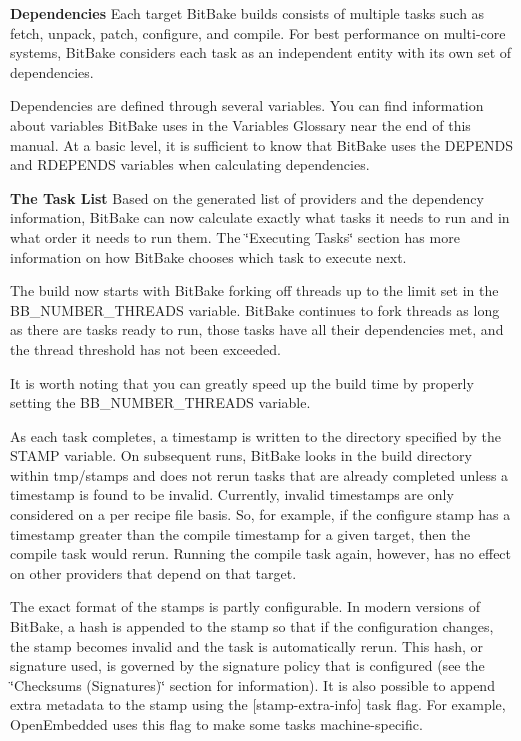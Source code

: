 \begin{DoxyItemize}
\item {\bfseries Dependencies} Each target Bit\+Bake builds consists of multiple tasks such as fetch, unpack, patch, configure, and compile. For best performance on multi-\/core systems, Bit\+Bake considers each task as an independent entity with its own set of dependencies.

Dependencies are defined through several variables. You can find information about variables Bit\+Bake uses in the Variables Glossary near the end of this manual. At a basic level, it is sufficient to know that Bit\+Bake uses the D\+E\+P\+E\+N\+DS and R\+D\+E\+P\+E\+N\+DS variables when calculating dependencies. ~\newline

\item {\bfseries The Task List} Based on the generated list of providers and the dependency information, Bit\+Bake can now calculate exactly what tasks it needs to run and in what order it needs to run them. The \char`\"{}\+Executing Tasks\char`\"{} section has more information on how Bit\+Bake chooses which task to execute next.

The build now starts with Bit\+Bake forking off threads up to the limit set in the B\+B\+\_\+\+N\+U\+M\+B\+E\+R\+\_\+\+T\+H\+R\+E\+A\+DS variable. Bit\+Bake continues to fork threads as long as there are tasks ready to run, those tasks have all their dependencies met, and the thread threshold has not been exceeded.

It is worth noting that you can greatly speed up the build time by properly setting the B\+B\+\_\+\+N\+U\+M\+B\+E\+R\+\_\+\+T\+H\+R\+E\+A\+DS variable.

As each task completes, a timestamp is written to the directory specified by the S\+T\+A\+MP variable. On subsequent runs, Bit\+Bake looks in the build directory within tmp/stamps and does not rerun tasks that are already completed unless a timestamp is found to be invalid. Currently, invalid timestamps are only considered on a per recipe file basis. So, for example, if the configure stamp has a timestamp greater than the compile timestamp for a given target, then the compile task would rerun. Running the compile task again, however, has no effect on other providers that depend on that target.

The exact format of the stamps is partly configurable. In modern versions of Bit\+Bake, a hash is appended to the stamp so that if the configuration changes, the stamp becomes invalid and the task is automatically rerun. This hash, or signature used, is governed by the signature policy that is configured (see the \char`\"{}\+Checksums (\+Signatures)\char`\"{} section for information). It is also possible to append extra metadata to the stamp using the \mbox{[}stamp-\/extra-\/info\mbox{]} task flag. For example, Open\+Embedded uses this flag to make some tasks machine-\/specific. ~\newline


\end{DoxyItemize}
